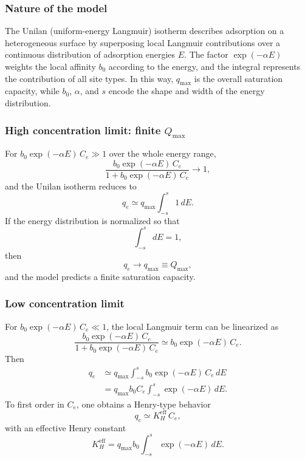 \documentclass[12pt]{article}
\begin{document}
	\subsubsection{Nature of the model}
	
	The Unilan (uniform-energy Langmuir) isotherm describes adsorption on a
	heterogeneous surface by superposing local Langmuir contributions over a
	continuous distribution of adsorption energies $E$. The factor
	$\exp(-\alpha E)$ weights the local affinity $b_0$ according to the energy,
	and the integral represents the contribution of all site types. In this way,
	$q_{\max}$ is the overall saturation capacity, while $b_0$, $\alpha$, and $s$
	encode the shape and width of the energy distribution.
	
	\subsubsection{High concentration limit: finite $Q_{\max}$}
	
	For $b_0 \exp(-\alpha E)\, C_e \gg 1$ over the whole energy range,
	\[
	\frac{b_0 \exp(-\alpha E)\, C_e}{1 + b_0 \exp(-\alpha E)\, C_e} \to 1,
	\]
	and the Unilan isotherm reduces to
	\begin{equation}
		q_e \simeq q_{\max} \int_{-s}^{s} 1 \, dE.
	\end{equation}
	If the energy distribution is normalized so that
	\[
	\int_{-s}^{s} dE = 1,
	\]
	then
	\begin{equation}
		q_e \to q_{\max} \equiv Q_{\max},
	\end{equation}
	and the model predicts a finite saturation capacity.
	
	\subsubsection{Low concentration limit}
	
	For $b_0 \exp(-\alpha E)\, C_e \ll 1$, the local Langmuir term can be
	linearized as
	\[
	\frac{b_0 \exp(-\alpha E)\, C_e}{1 + b_0 \exp(-\alpha E)\, C_e}
	\simeq b_0 \exp(-\alpha E)\, C_e.
	\]
	Then
	\begin{align}
		q_e
		&\simeq q_{\max} \int_{-s}^{s} b_0 \exp(-\alpha E)\, C_e \, dE \nonumber \\
		&= q_{\max} b_0 C_e \int_{-s}^{s} \exp(-\alpha E)\, dE.
	\end{align}
	To first order in $C_e$, one obtains a Henry-type behavior
	\begin{equation}
		q_e \simeq K_H^{\mathrm{eff}}\, C_e,
	\end{equation}
	with an effective Henry constant
	\begin{equation}
		K_H^{\mathrm{eff}} = q_{\max} b_0 \int_{-s}^{s} \exp(-\alpha E)\, dE.
	\end{equation}
	
\end{document}
